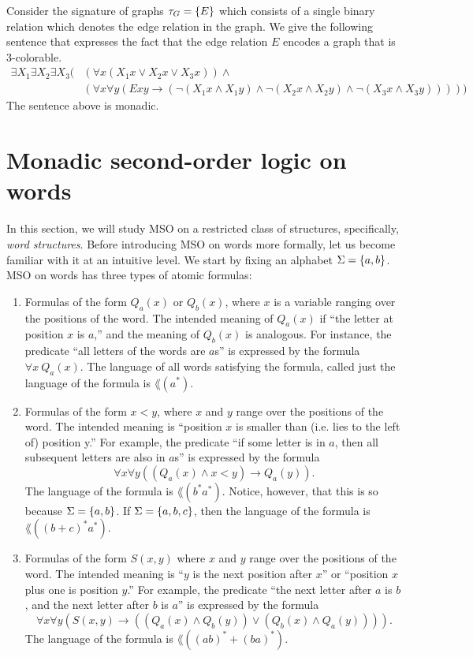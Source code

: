 \documentclass[11pt,twoside=off,numbers=noenddot]{scrbook}
\begin{document}
\begin{example}
  Consider the signature of graphs $\tau_G = \{ E \}$ which consists of a single binary relation which denotes the edge relation in the graph. We give the following sentence that expresses the fact that the edge relation $E$ encodes a graph that is 3-colorable.
  \begin{align*}
    \exists X_1 \exists X_2 \exists X_3 ( & (\forall x (X_1 x \vee X_2 x \vee X_3 x)) \wedge \\
    & (\forall x \forall y (E x y \rightarrow (\neg (X_1 x \wedge X_1 y) \wedge \neg (X_2 x \wedge X_2 y) \wedge \neg (X_3 x \wedge X_3 y)))))
  \end{align*}
  The sentence above is monadic.
\end{example}

\section{Monadic second-order logic on words}
In this section, we will study MSO on a restricted class of structures, specifically, \emph{word structures}. Before introducing MSO on words more formally, let us become familiar with it at an intuitive level. We start by fixing an alphabet $\Sigma = \{ a, b \}$. MSO on words has three types of atomic formulas:
\begin{enumerate}
  \item Formulas of the form $Q_a(x)$ or $Q_b(x)$, where $x$ is a variable ranging over the positions of the word. The intended meaning of $Q_a(x)$ if ``the letter at position $x$ is $a$,'' and the meaning of $Q_b(x)$ is analogous. For instance, the predicate ``all letters of the words are $a$s'' is expressed by the formula $\forall x \ Q_a(x)$. The language of all words satisfying the formula, called just the language of the formula is $\lang(a^\ast)$.
  \item Formulas of the form $x < y$, where $x$ and $y$ range over the positions of the word. The intended meaning is ``position $x$ is smaller than (i.e. lies to the left of) position y.'' For example, the predicate ``if some letter is in $a$, then all subsequent letters are also in $a$s'' is expressed by the formula
    \[ \forall x \forall y ((Q_a(x) \wedge x < y) \rightarrow Q_a(y)). \]
    The language of the formula is $\lang(b^\ast a^\ast)$. Notice, however, that this is so because $\Sigma = \{ a, b \}$. If $\Sigma = \{ a, b, c \}$, then the language of the formula is $\lang((b + c)^\ast a^\ast)$.
  \item Formulas of the form $S(x, y)$ where $x$ and $y$ range over the positions of the word. The intended meaning is ``$y$ is the next position after $x$'' or ``position $x$ plus one is position $y$.'' For example, the predicate ``the next letter after $a$ is $b$, and the next letter after $b$ is $a$'' is expressed by the formula
    \[ \forall x \forall y (S(x, y) \rightarrow ((Q_a(x) \wedge Q_b(y)) \vee (Q_b(x) \wedge Q_a(y)))). \]
    The language of the formula is $\lang((ab)^\ast + (ba)^\ast)$.
\end{enumerate}
\end{document}
